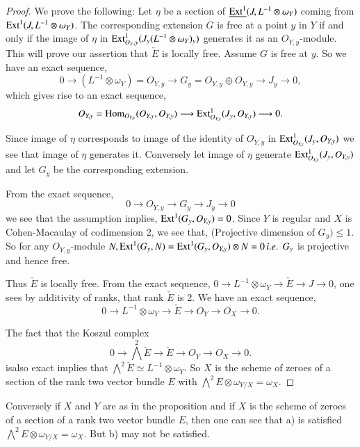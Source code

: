 \begin{proof}
We prove the following: Let $\eta$ be a section of $\underline{\operatorname{Ext}^1}
(J,L^{-1}\otimes\omega_Y)$ coming from
$\operatorname{Ext}^1(J,L^{-1}\otimes\omega_Y)$. The corresponding extension $G$ is
free at a point $y$ in $Y$ if and only if the image of $\eta$ in
$\operatorname{Ext}_{O_Y,y}^1(J_y(L^{-1}\otimes\omega_Y)_y)$ generates it as an
$O_{Y,y}$-module. This will prove our assertion that $\check{E}$ is
locally free. Assume $G$ is free at $y$. So we have an exact sequence,
$$
0\longrightarrow(L^{-1}\otimes\omega_Y)=O_{Y, y}\longrightarrow G_y=
O_{Y,y}\oplus O_{Y,y}\longrightarrow J_y\longrightarrow 0,
$$
which gives rise to an exact sequence,
$$
O_{Y,y}=\operatorname{Hom}_{O_{Y,y}}(O_{Y,y},O_{Y,y})\longrightarrow\operatorname{Ext}_{O_{Y,y}}^1
(J_y,O_{Y,y})\longrightarrow 0.
$$\pageoriginale

Since image of $\eta$ corresponds to image of the identity of
$O_{Y,y}$ in $\operatorname{Ext}_{O_{Y,y}}^1(J_y,O_{Y,y})$ we see that image of
$\eta$ generates it. Conversely let image of $\eta$ generate
$\operatorname{Ext}_{O_{Y,y}}^1(J_y,O_{Y,y})$ and let $G_y$ be the corresponding
extension. 

From the exact sequence,
$$
0\longrightarrow O_{Y,y}\longrightarrow G_y\longrightarrow J_y
\longrightarrow 0
$$
we see that the assumption implies, $\operatorname{Ext}^1(G_y,O_{Y,y})=0$. Since $Y$
is regular and $X$ is Cohen-Macaulay of codimension 2, we see that,
(Projective dimension of $G_y)\leq 1$. So for any $O_{Y,y}$-module
$N, \operatorname{Ext}^1(G_y,N)=\operatorname{Ext}^1(G_y,O_{Y,y})\otimes N=0 \,{i.e.}\kern.3em\, G_y$ is
projective and hence free. 

Thus $\check{E}$ is locally free. From the exact sequence,
$0\longrightarrow L^{-1}\otimes\omega_Y\longrightarrow\check{E}
\longrightarrow J\longrightarrow 0$, one sees by additivity of ranks,
that rank $\check{E}$ is 2. We have an exact sequence,
$$
0\longrightarrow L^{-1}\otimes\omega_Y\longrightarrow\check{E}
\longrightarrow O_Y\longrightarrow O_X\longrightarrow 0.
$$

The fact that the Koszul complex
$$
0\longrightarrow\bigwedge\limits^2\check{E}\longrightarrow\check{E}
\longrightarrow O_Y\longrightarrow O_X\longrightarrow 0.
$$
is\pageoriginale also exact implies that $\bigwedge\limits^2\check{E}
\simeq L^{-1}\otimes\omega_Y$. So $X$ is the scheme of zeroes of a
section of the rank two vector bundle $E$ with $\bigwedge\limits^2E
\otimes\omega_{Y/X}=\omega_X$. 
\end{proof}

\begin{REM*}
Conversely if $X$ and $Y$ are as in the proposition and if $X$ is the
scheme of zeroes of a section of a rank two vector bundle $E$, then
one can see that a) is satisfied \ie $\bigwedge\limits^2E\otimes
\omega_{Y/X}=\omega_X$. But b) may not be satisfied.
\end{REM*}

